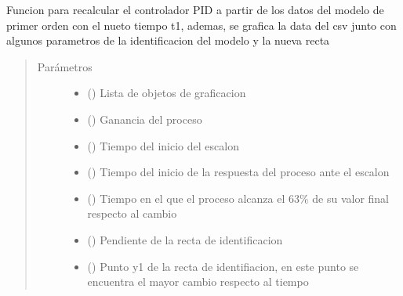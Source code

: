 \documentclass[letterpaper,10pt,spanish]{sphinxmanual}
\begin{document}

\begin{fulllineitems}
\label{\detokenize{codigos/rutinas_CSV:rutinas_CSV.calculos_manual}}
Funcion para recalcular el controlador PID a partir de los datos del modelo de primer orden con el nueto tiempo t1, ademas, se grafica la data del csv junto con algunos parametros de la identificacion del modelo y la nueva recta
\begin{quote}\begin{description}
\item[{Parámetros}] \leavevmode\begin{itemize}
\item {} 
 () \textendash{} Lista de objetos de graficacion

\item {} 
 () \textendash{} Ganancia del proceso

\item {} 
 () \textendash{} Tiempo del inicio del escalon

\item {} 
 () \textendash{} Tiempo del inicio de la respuesta del proceso ante el escalon

\item {} 
 () \textendash{} Tiempo en el que el proceso alcanza el 63\% de su valor final respecto al cambio

\item {} 
 () \textendash{} Pendiente de la recta de identificacion

\item {} 
 () \textendash{} Punto y1 de la recta de identifiacion, en este punto se encuentra el mayor cambio respecto al tiempo

\end{itemize}

\end{description}\end{quote}

\end{fulllineitems}
\end{document}
